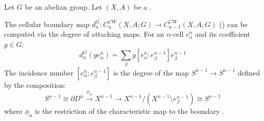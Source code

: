 \begin{proposition} \label{proposition:relative_cellular_homology_of_CW_pair_with_coefficients_in_an_abelian_group_can_be_computed_by_degree_of_attaching_maps}
Let $G$ be an abelian group. Let $(X, A)$ be a .  

The cellular boundary map $d_n^G: C_n^{CW}(X,A;G) \to C_{n-1}^{CW}(X,A;G)$ () can be computed via the degree of attaching maps. For an $n$-cell $e_{\alpha}^n$ and its coefficient $g \in G$:
$$d_n^G(g e_{\alpha}^n) = \sum_{\beta} g [e_{\alpha}^n : e_{\beta}^{n-1}] e_{\beta}^{n-1}$$
The incidence number $[e_{\alpha}^n : e_{\beta}^{n-1}]$ is the degree of the map $S^{n-1} \to S^{n-1}$ defined by the composition:
$$S^{n-1} \cong \partial D^n \xrightarrow{\phi_{\alpha}} X^{n-1} \to X^{n-1}/(X^{n-1} \setminus e_{\beta}^{n-1}) \cong S^{n-1}$$
where $\phi_{\alpha}$ is the restriction of the characteristic map to the boundary .
\end{proposition}